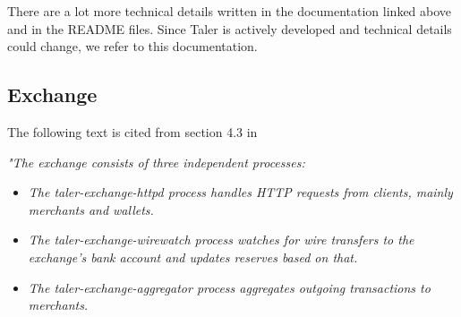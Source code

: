 There are a lot more technical details written in the documentation linked above and in the README files.
Since Taler is actively developed and technical details could change, we refer to this documentation.

\subsection{Exchange}
The following text is cited from section 4.3 in \cite{dold:the-gnu-taler-system}
\begin{center}
    \textit{
        "The exchange consists of three independent processes:
    }
\end{center}
\begin{itemize}
    \item \textit{The taler-exchange-httpd process handles HTTP requests from clients, mainly merchants and wallets.}
    \item \textit{The taler-exchange-wirewatch process watches for wire transfers to the exchange’s bank account and updates reserves based on that.}
    \item \textit{The taler-exchange-aggregator process aggregates outgoing transactions to merchants.}
\end{itemize}

